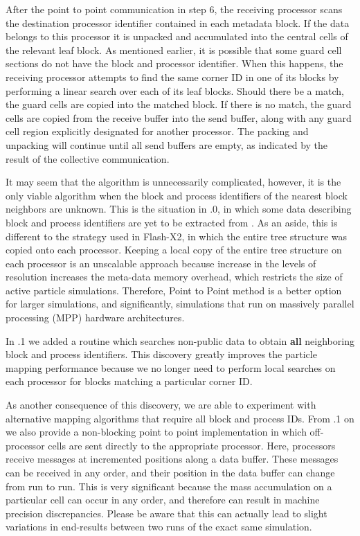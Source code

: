 After the point to point communication in step 6, the receiving
processor scans the destination processor identifier contained in each
metadata block.  If the data belongs to this processor it is unpacked
and accumulated into the central cells of the relevant leaf block.  As
mentioned earlier, it is possible that some guard cell sections do not
have the block and processor identifier.  When this happens, the
receiving processor attempts to find the same corner ID in one of its
blocks by performing a linear search over each of its leaf blocks.
Should there be a match, the guard cells are copied into the matched
block.  If there is no match, the guard cells are copied from the receive
buffer into the send buffer, along with any guard cell region
explicitly designated for another processor.  The packing and
unpacking will continue until all send buffers are empty, as indicated
by the result of the collective communication.

It may seem that the algorithm is unnecessarily complicated, however,
it is the only viable algorithm when the block and process identifiers
of the nearest block neighbors are unknown.  This is the situation in
\flashx.0, in which some data describing block and process
identifiers are yet to be extracted from \Paramesh.  
As an aside, this is different to the strategy used in Flash-X2, in
which the entire \Paramesh tree structure was copied onto each
processor.  Keeping a local copy of the entire \Paramesh tree
structure on each processor is an unscalable approach because increase
in the levels of resolution increases the meta-data memory overhead,
which restricts the size of  active particle simulations.  Therefore,
Point to Point method is a better option for
larger simulations, and significantly, simulations that run on
massively parallel processing (MPP) hardware architectures. 

In \flashx.1 we added a routine which searches non-public \Paramesh
data to obtain {\bf all} neighboring block and process identifiers.  This
discovery greatly improves the particle mapping performance because we
no longer need to perform local searches on each processor for blocks
matching a particular corner ID.

As another consequence of this discovery, we are able to experiment
with alternative mapping algorithms that require all block and process
IDs.  From \flashx.1 on we also provide a non-blocking point
to point implementation in which off-processor cells are sent directly
to the appropriate processor.  Here, processors receive messages at
incremented positions along a data buffer.  These messages can be
received in any order, and their position in the data buffer can
change from run to run.  This is very significant because the mass
accumulation on a particular cell can occur in any order, and
therefore can result in machine precision discrepancies.  Please be
aware that this can actually lead to slight variations in end-results
between two runs of the exact same simulation.  

